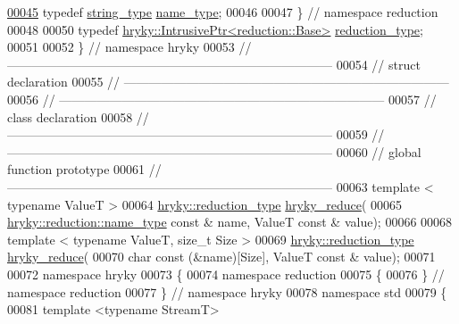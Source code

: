 \begin{DoxyCode}
\hypertarget{reduction__common_8h_source_l00045}{}\hyperlink{namespacehryky_1_1reduction_ac686c30a4c8d196bbd0f05629a6b921f}{00045}     \textcolor{keyword}{typedef} \hyperlink{classhryky_1_1reduction_1_1_string}{string_type}     \hyperlink{namespacehryky_1_1reduction_ac686c30a4c8d196bbd0f05629a6b921f}{name_type};  
00046 
00047 \} \textcolor{comment}{// namespace reduction}
00048 
00050     \textcolor{keyword}{typedef} \hyperlink{classhryky_1_1_intrusive_ptr}{hryky::IntrusivePtr<reduction::Base>}  \hyperlink{namespacehryky_a343a9a4c36a586be5c2693156200eadc}{reduction_type};
00051 
00052 \} \textcolor{comment}{// namespace hryky}
00053 \textcolor{comment}{//
      ------------------------------------------------------------------------------}
00054 \textcolor{comment}{// struct declaration}
00055 \textcolor{comment}{//
      ------------------------------------------------------------------------------}
00056 \textcolor{comment}{//
      ------------------------------------------------------------------------------}
00057 \textcolor{comment}{// class declaration}
00058 \textcolor{comment}{//
      ------------------------------------------------------------------------------}
00059 \textcolor{comment}{//
      ------------------------------------------------------------------------------}
00060 \textcolor{comment}{// global function prototype}
00061 \textcolor{comment}{//
      ------------------------------------------------------------------------------}
00063 \textcolor{comment}{}\textcolor{keyword}{template} < \textcolor{keyword}{typename} ValueT >
00064 \hyperlink{classhryky_1_1_intrusive_ptr}{hryky::reduction_type} \hyperlink{reduction__common_8h_afc72326c9900838c5db40438318794dd}{hryky_reduce}(
00065     \hyperlink{classhryky_1_1reduction_1_1_string}{hryky::reduction::name_type} \textcolor{keyword}{const} & name, ValueT \textcolor{keyword}{const} & value);
00066 
00068 \textcolor{keyword}{template} < \textcolor{keyword}{typename} ValueT, \textcolor{keywordtype}{size\_t} Size >
00069 \hyperlink{classhryky_1_1_intrusive_ptr}{hryky::reduction_type} \hyperlink{reduction__common_8h_afc72326c9900838c5db40438318794dd}{hryky_reduce}(
00070     \textcolor{keywordtype}{char} \textcolor{keyword}{const} (&name)[Size], ValueT \textcolor{keyword}{const} & value);
00071 
00072 \textcolor{keyword}{namespace }hryky
00073 \{
00074 \textcolor{keyword}{namespace }reduction
00075 \{
00076 \} \textcolor{comment}{// namespace reduction}
00077 \} \textcolor{comment}{// namespace hryky}
00078 \textcolor{keyword}{namespace }std
00079 \{
00081     \textcolor{keyword}{template} <\textcolor{keyword}{typename} StreamT>

\end{DoxyCode}
